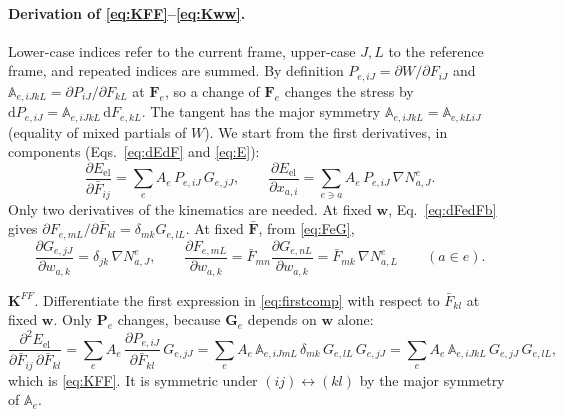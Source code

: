 \documentclass[11pt,a4paper]{article}
\newcommand{\Fb}{\bar{\mathbf F}}
\newcommand{\F}{\mathbf F}
\newcommand{\Pk}{\mathbf P}
\newcommand{\w}{\mathbf w}
\newcommand{\G}{\mathbf G}
\begin{document}
\paragraph{Derivation of \eqref{eq:KFF}--\eqref{eq:Kww}.}
Lower-case indices refer to the current frame, upper-case \(J,L\) to the reference frame, and
repeated indices are summed. By definition \(P_{e,iJ}=\partial W/\partial F_{iJ}\) and
\(\mathbb A_{e,iJkL}=\partial P_{iJ}/\partial F_{kL}\) at \(\F_e\), so a change of \(\F_e\) changes the
stress by \(\mathrm dP_{e,iJ}=\mathbb A_{e,iJkL}\,\mathrm dF_{e,kL}\). The tangent has the major symmetry
\(\mathbb A_{e,iJkL}=\mathbb A_{e,kLiJ}\) (equality of mixed partials of \(W\)). We start from the
first derivatives, in components (Eqs.~\eqref{eq:dEdF} and \eqref{eq:E}):
\begin{equation}
  \frac{\partial E_{\mathrm{el}}}{\partial\bar F_{ij}}=\sum_eA_e\,P_{e,iJ}\,G_{e,jJ},\qquad
  \frac{\partial E_{\mathrm{el}}}{\partial x_{a,i}}=\sum_{e\ni a}A_e\,P_{e,iJ}\,\nabla N^e_{a,J}.
  \label{eq:firstcomp}
\end{equation}
Only two derivatives of the kinematics are needed. At fixed \(\w\), Eq.~\eqref{eq:dFedFb} gives
\(\partial F_{e,mL}/\partial\bar F_{kl}=\delta_{mk}G_{e,lL}\). At fixed \(\Fb\), from \eqref{eq:FeG},
\begin{equation}
  \frac{\partial G_{e,jJ}}{\partial w_{a,k}}=\delta_{jk}\,\nabla N^e_{a,J},\qquad
  \frac{\partial F_{e,mL}}{\partial w_{a,k}}=\bar F_{mn}\frac{\partial G_{e,nL}}{\partial w_{a,k}}
  =\bar F_{mk}\,\nabla N^e_{a,L}\qquad(a\in e).
  \label{eq:dGdw}
\end{equation}

\emph{\(\mathbf K^{FF}\).} Differentiate the first expression in \eqref{eq:firstcomp} with respect
to \(\bar F_{kl}\) at fixed \(\w\). Only \(\Pk_e\) changes, because \(\G_e\) depends on \(\w\) alone:
\[
  \frac{\partial^2E_{\mathrm{el}}}{\partial\bar F_{ij}\,\partial\bar F_{kl}}
  =\sum_eA_e\,\frac{\partial P_{e,iJ}}{\partial\bar F_{kl}}\,G_{e,jJ}
  =\sum_eA_e\,\mathbb A_{e,iJmL}\,\delta_{mk}\,G_{e,lL}\,G_{e,jJ}
  =\sum_eA_e\,\mathbb A_{e,iJkL}\,G_{e,jJ}\,G_{e,lL},
\]
which is \eqref{eq:KFF}. It is symmetric under \((ij)\leftrightarrow(kl)\) by the major symmetry of
\(\mathbb A_e\).
\end{document}
